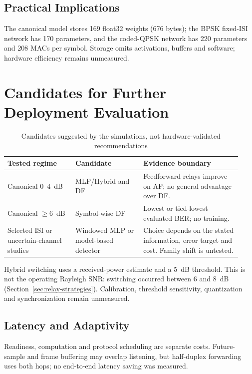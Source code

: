 \subsection{Practical Implications}\label{sec:practical-implications}

The canonical model stores 169 float32 weights (676 bytes); the BPSK fixed-ISI network has 170 parameters, and the coded-QPSK network has 220 parameters and 208 MACs per symbol. Storage omits activations, buffers and software; hardware efficiency remains unmeasured.

\section{Candidates for Further Deployment Evaluation}\label{sec:practical-deployment-recommendations}

\begin{longtable}{@{}p{0.27\linewidth}p{0.27\linewidth}p{0.39\linewidth}@{}}
\caption[Simulation-supported candidates]{Candidates suggested by the simulations, not hardware-validated recommendations}\label{tbl:table32}\\
\toprule
Tested regime & Candidate & Evidence boundary\\
\midrule
Canonical 0--4~dB & MLP/Hybrid and DF & Feedforward relays improve on AF; no general advantage over DF.\\
Canonical $\geq6$~dB & Symbol-wise DF & Lowest or tied-lowest evaluated BER; no training.\\
Selected ISI or uncertain-channel studies & Windowed MLP or model-based detector & Choice depends on the stated information, error target and cost. Family shift is untested.\\
\bottomrule
\end{longtable}

Hybrid switching uses a received-power estimate and a 5~dB threshold. This is not the operating Rayleigh SNR: switching occurred between 6 and 8~dB (Section~\ref{sec:relay-strategies}). Calibration, threshold sensitivity, quantization and synchronization remain unmeasured.

\subsection{Latency and Adaptivity}\label{sec:latency-and-adaptivity-considerations}

Readiness, computation and protocol scheduling are separate costs. Future-sample and frame buffering may overlap listening, but half-duplex forwarding uses both hops; no end-to-end latency saving was measured.

